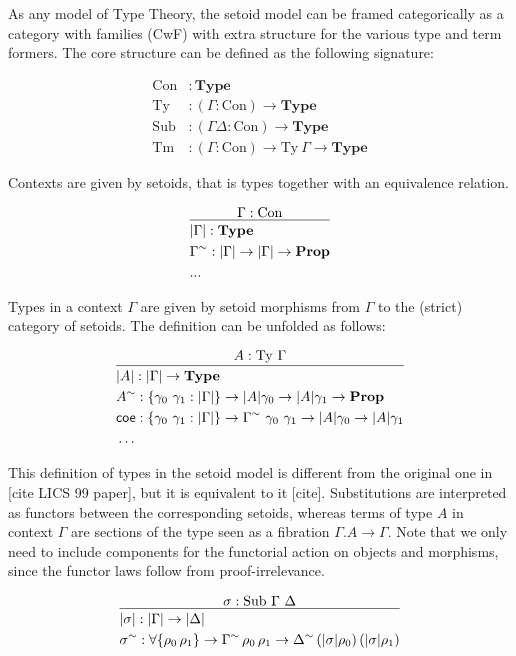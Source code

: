 \documentclass{easychair}
\newcommand{\GG}{\Gamma}
\newcommand{\GD}{\Delta}
\newcommand{\mType}{\mathbf{Type}}
\newcommand{\mProp}{\mathbf{Prop}}
\newcommand{\Con}{\mathrm{Con}}
\newcommand{\Ty}{\mathrm{Ty}}
\newcommand{\Tm}{\mathrm{Tm}}
\newcommand{\Sub}{\mathrm{Sub}}
\begin{document}
As any model of Type Theory, the setoid model can be framed categorically as a
category with families (CwF) with extra structure for the various type and term
formers. The core structure can be defined as the following signature:

\begin{align*}
  \Con &: \mType \\
  \Ty &: (\GG : \Con) \to \mType \\
  \Sub &: (\GG \GD : \Con) \to \mType \\
  \Tm &: (\GG : \Con) \to \Ty\ \GG \to \mType
\end{align*}

Contexts are given by setoids, that is types together with an equivalence relation.

\[
\infer{
  \begin{aligned}
    & | \GG | : \mType \\
    & \GG^\sim : | \GG | \to | \GG | \to \mProp \\
    & ...
  \end{aligned}
}{
  \GG : \Con
}
\]

Types in a context $\GG$ are given by setoid morphisms from $\GG$ to the
(strict) category of setoids. The definition can be unfolded as follows:

\[
\infer{
  \begin{aligned}
    & | A | : | \GG | \to \mType \\
    & A^\sim : \{\gamma_0\ \gamma_1 : | \GG |\}
    \to | A | \gamma_0 \to | A | \gamma_1 \to \mProp \\
    & \textsf{coe} : \{\gamma_0\ \gamma_1 : | \GG |\} \to \GG^\sim\ \gamma_0\ \gamma_1 \to | A | \gamma_0 \to | A | \gamma_1 \\
    & \dots
  \end{aligned}
}{
  A : \Ty\ \GG
}
\]

This definition of types in the setoid model is different from the original one
in [cite LICS 99 paper], but it is equivalent to it [cite].
%
Substitutions are interpreted as functors between the corresponding setoids,
whereas terms of type $A$ in context $\GG$ are sections of the type seen as a
fibration $\GG . A \to \GG$. Note that we only need to include components for
the functorial action on objects and morphisms, since the functor laws follow
from proof-irrelevance.

\[
\infer{
  \begin{aligned}
    & | \sigma | : | \GG | \to | \GD | \\
    & \sigma^\sim : \forall\{\rho_0\, \rho_1\} \to \GG^\sim\, \rho_0\, \rho_1 \to \GD^\sim\, (|\sigma|\rho_0)\, (|\sigma|\rho_1)
  \end{aligned}
}{
  \sigma : \Sub\ \GG\ \GD
}
\]
\end{document}
